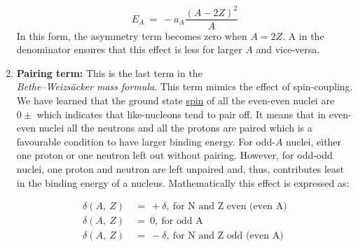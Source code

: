 \documentclass[ebook,12pt,oneside,openany]{memoir}
\begin{document}
\begin{enumerate}[label=\textbf{\Alph*.}]
            \[E_A~=~-a_A\frac{(A-2Z)^2}{A}\]
            \hspace{3em} In this form, the asymmetry term becomes zero when $A = 2Z$. A in the denominator ensures that this effect is less for larger $A$ and vice-versa.
            
        \item \textbf{Pairing term:}    This is the last term in the\\\textit{Bethe–Weizsäcker mass formula}. This term mimics the effect of spin-coupling. We have learned that the ground state \href{https://en.wikipedia.org/wiki/Spin_(physics)}{spin} of all the even-even nuclei are \href{https://drive.google.com/open?id=18RsdVErJJl_99e-parV5QwhS9Gux2CG35fvEiPZISR0}{$0\pm$} which indicates that like-nucleons tend to pair off. It means that in even-even nuclei all the neutrons and all the protons are paired which is a favourable condition to have larger binding energy. For odd-$A$ nuclei, either one proton or one neutron left out without pairing. However, for odd-odd nuclei, one proton and neutron are left unpaired and, thus, contributes least in the binding energy of a nucleus. Mathematically this effect is expressed as:
        
            \begin{equation}
                \begin{split}
                    \delta(A,~Z)~&=~+\delta,~ \textrm       {for N and Z even (even A)}\\
                    \delta(A,~Z)~&=~0,~ \textrm             {for odd A}\\
                    \delta(A,~Z)~&=~-\delta,~ \textrm       {for N and Z odd (even A)}\\
                \end{split}
            \end{equation}
            

\end{enumerate}
\end{document}
